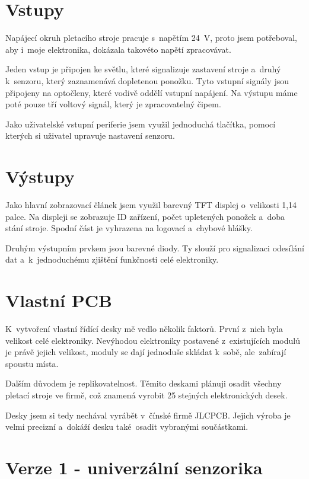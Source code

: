 \section{Vstupy}
Napájecí okruh pletacího stroje pracuje s~napětím 24~V, proto jsem potřebo\-val, aby i~moje elektronika, dokázala takovéto napětí zpracovávat.

Jeden vstup je připojen ke světlu, které signalizuje zastavení stroje a~druhý k~senzoru, který zaznamenává dopletenou ponožku.
Tyto vstupní signály jsou připojeny na optočleny, které vodivě oddělí vstupní napájení.
Na výstupu máme poté pouze tří voltový signál, který je zpracovatelný čipem.

Jako uživatelské vstupní periferie jsem využil jednoduchá tlačítka, pomocí kterých si uživatel upravuje nastavení senzoru.


\section{Výstupy}
Jako hlavní zobrazovací článek jsem využil barevný TFT displej o~velikosti 1,14 palce.
Na displeji se zobrazuje ID zařízení, počet upletených ponožek a~doba stání stroje.
Spodní část je vyhrazena na logovací a~chybové hlášky.

Druhým výstupním prvkem jsou barevné diody.
Ty slouží pro signalizaci odesílání dat a~k~jednoduchému zjištění funkčnosti celé elektroniky.



\section{Vlastní PCB}
K~vytvoření vlastní řídící desky mě vedlo několik faktorů. První z~nich byla velikost celé elektroniky. 
Nevýhodou elektroniky postavené z~existujících modulů je právě jejich velikost, moduly se dají jednoduše skládat k~sobě, ale~zabírají spoustu místa. 
 
Dalším důvodem je replikovatelnost. Těmito deskami plánuji osadit všechny pletací stroje ve firmě, což znamená vyrobit 25 stejných elektronických desek.

Desky jsem si tedy nechával vyrábět v~čínské firmě JLCPCB. Jejich výroba je velmi precizní a~dokáží desku také~osadit vybranými součástkami.


\newpage

\section{Verze 1 - univerzální senzorika}

